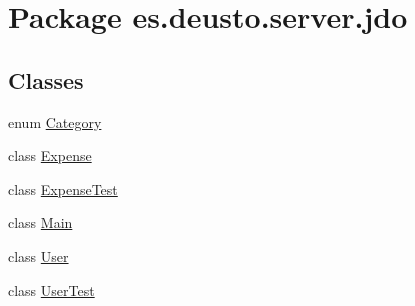 \hypertarget{namespacees_1_1deusto_1_1server_1_1jdo}{}\section{Package es.\+deusto.\+server.\+jdo}
\label{namespacees_1_1deusto_1_1server_1_1jdo}
\subsection*{Classes}
\begin{DoxyCompactItemize}
\item 
enum \hyperlink{enumes_1_1deusto_1_1server_1_1jdo_1_1_category}{Category}
\item 
class \hyperlink{classes_1_1deusto_1_1server_1_1jdo_1_1_expense}{Expense}
\item 
class \hyperlink{classes_1_1deusto_1_1server_1_1jdo_1_1_expense_test}{Expense\+Test}
\item 
class \hyperlink{classes_1_1deusto_1_1server_1_1jdo_1_1_main}{Main}
\item 
class \hyperlink{classes_1_1deusto_1_1server_1_1jdo_1_1_user}{User}
\item 
class \hyperlink{classes_1_1deusto_1_1server_1_1jdo_1_1_user_test}{User\+Test}
\end{DoxyCompactItemize}
